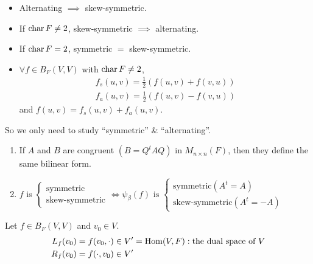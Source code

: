\begin{remark} \mbox{}
  \begin{itemize}
    \item Alternating $\implies$ skew-symmetric.
    \item If $\operatorname{char} F \ne 2$, skew-symmetric $\implies$ alternating.
    \item If $\operatorname{char} F = 2$, symmetric $=$ skew-symmetric.
    \item $\forall f \in B_F(V, V)$ with $\operatorname{char} F \ne 2$,
      \begin{align*}
        f_s(u, v) = \frac{1}{2}\left(f(u, v) + f(v, u)\right) \\
        f_a(u, v) = \frac{1}{2}\left(f(u, v) - f(v, u)\right)
      \end{align*}
      and $f(u, v) = f_s(u, v) + f_a(u, v)$.
  \end{itemize}
\end{remark}

So we only need to study ``symmetric'' \& ``alternating''.

\newpage

\begin{exercise} \mbox{}
  \begin{enumerate}
    \item If $A$ and $B$ are congruent $(B = Q^tAQ)$ in $M_{n\times n}(F)$,
      then they define the same bilinear form.
    \item $f$ is
      $\begin{cases}
        \text{symmetric} \\
        \text{skew-symmetric}
      \end{cases} \iff \psi_\beta(f) \text{~is~}
      \begin{cases}
        \text{symmetric} (A^t = A)\\
        \text{skew-symmetric} (A^t = -A)
      \end{cases}$
  \end{enumerate}
\end{exercise}

\begin{observation*}
  Let $f \in B_F(V, V)$ and $v_0 \in V$.
  \begin{align*}
    L_f(v_0) &= f(v_0, \cdot) \in V' = \operatorname{Hom}(V, F):
    \text{the dual space of $V$} \\
    R_f(v_0) &= f(\cdot, v_0) \in V'
  \end{align*}
\end{observation*}

